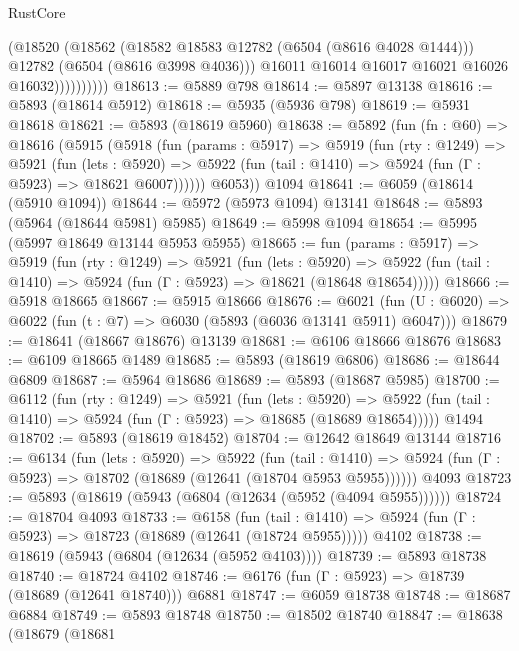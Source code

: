 \begin{lexlean}{RustCore}
\begin{coremodule}
                      (@18520
                        (@18562
                          (@18582 @18583 @12782 (@6504 (@8616 @4028 @1444)))
                          @12782
                          (@6504 (@8616 @3998 @4036)))
                        @16011
                        @16014
                        @16017
                        @16021
                        @16026
                        @16032))))))))))
@18613 := @5889 @798
@18614 := @5897 @13138
@18616 := @5893 (@18614 @5912)
@18618 := @5935 (@5936 @798)
@18619 := @5931 @18618
@18621 := @5893 (@18619 @5960)
@18638 := @5892
    (fun (fn : @60) =>
    @18616
      (@5915
        (@5918
          (fun (params : @5917) =>
          @5919
            (fun (rty : @1249) =>
            @5921
              (fun (lets : @5920) =>
              @5922 (fun (tail : @1410) => @5924 (fun (Γ : @5923) => @18621 @6007))))))
        @6053))
    @1094
@18641 := @6059 (@18614 (@5910 @1094))
@18644 := @5972 (@5973 @1094) @13141
@18648 := @5893 (@5964 (@18644 @5981) @5985)
@18649 := @5998 @1094
@18654 := @5995 (@5997 @18649 @13144 @5953 @5955)
@18665 := fun (params : @5917) =>
  @5919
    (fun (rty : @1249) =>
    @5921
      (fun (lets : @5920) =>
      @5922 (fun (tail : @1410) => @5924 (fun (Γ : @5923) => @18621 (@18648 @18654)))))
@18666 := @5918 @18665
@18667 := @5915 @18666
@18676 := @6021
    (fun (U : @6020) => @6022 (fun (t : @7) => @6030 (@5893 (@6036 @13141 @5911) @6047)))
@18679 := @18641 (@18667 @18676) @13139
@18681 := @6106 @18666 @18676
@18683 := @6109 @18665 @1489
@18685 := @5893 (@18619 @6806)
@18686 := @18644 @6809
@18687 := @5964 @18686
@18689 := @5893 (@18687 @5985)
@18700 := @6112
    (fun (rty : @1249) =>
    @5921
      (fun (lets : @5920) =>
      @5922 (fun (tail : @1410) => @5924 (fun (Γ : @5923) => @18685 (@18689 @18654)))))
    @1494
@18702 := @5893 (@18619 @18452)
@18704 := @12642 @18649 @13144
@18716 := @6134
    (fun (lets : @5920) =>
    @5922
      (fun (tail : @1410) =>
      @5924 (fun (Γ : @5923) => @18702 (@18689 (@12641 (@18704 @5953 @5955))))))
    @4093
@18723 := @5893 (@18619 (@5943 (@6804 (@12634 (@5952 (@4094 @5955))))))
@18724 := @18704 @4093
@18733 := @6158
    (fun (tail : @1410) => @5924 (fun (Γ : @5923) => @18723 (@18689 (@12641 (@18724 @5955)))))
    @4102
@18738 := @18619 (@5943 (@6804 (@12634 (@5952 @4103))))
@18739 := @5893 @18738
@18740 := @18724 @4102
@18746 := @6176 (fun (Γ : @5923) => @18739 (@18689 (@12641 @18740))) @6881
@18747 := @6059 @18738
@18748 := @18687 @6884
@18749 := @5893 @18748
@18750 := @18502 @18740
@18847 := @18638
    (@18679
      (@18681

\end{coremodule}
\end{lexlean}
